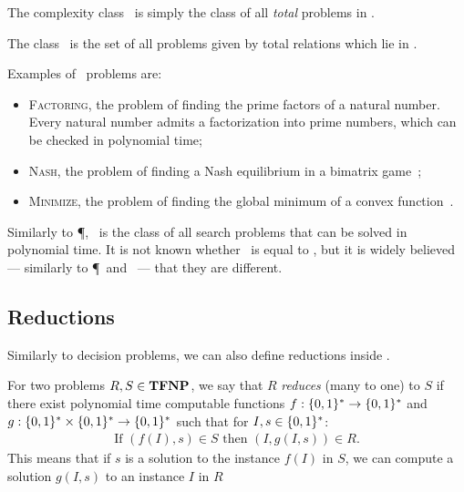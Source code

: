 The complexity class \TFNP\ is simply the class of all \emph{total} problems in \FNP\@.

\begin{definition}
	The class \TFNP\ is the set of all problems given by total relations which lie in \FNP\@.
\end{definition}

Examples of \TFNP\ problems are:
\begin{itemize}
	\item \textsc{Factoring}, the problem of finding the prime factors of a natural number. Every natural number admits a factorization into prime numbers, which can be checked in polynomial time;
	\item \textsc{Nash}, the problem of finding a Nash equilibrium in a bimatrix game~;
	\item \textsc{Minimize}, the problem of finding the global minimum of a convex function~.
\end{itemize}
Similarly to \P, \FP\ is the class of all search problems that can be solved in polynomial time. It is not known whether \FP\ is equal to \TFNP, but it is widely believed --- similarly to \P\ and \NP\ --- that they are different.

\subsection{Reductions}

Similarly to decision problems, we can also define reductions inside \TFNP\@.

\begin{definition}
	For two problems $R, S \in \textbf{TFNP}$, we say that $R$ \emph{reduces} (many to one) to $S$ if there exist polynomial time computable functions $f : \{0, 1\}^* \rightarrow \{0, 1\}^*$ and $g : \{0, 1\}^* \times \{0, 1\}^* \rightarrow \{0, 1\}^*$ such that for $I, s \in \{0, 1\}^*$:
	\begin{align*}
		\text{If } (f(I), s) \in S \text{ then } (I, g(I, s)) \in R.
	\end{align*}
	This means that if $s$ is a solution to the instance $f(I)$ in $S$, we can compute a solution $g(I, s)$ to an instance $I$ in $R$
\end{definition}

